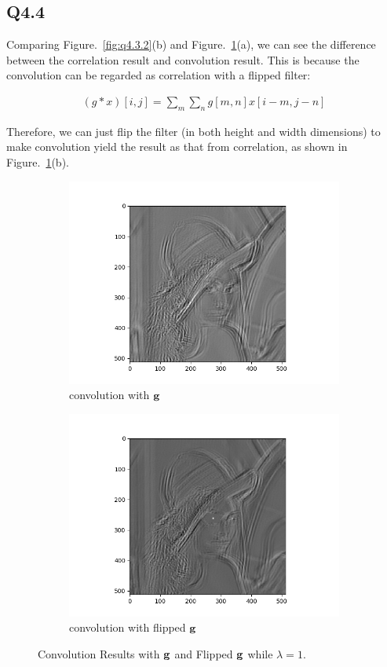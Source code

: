 \documentclass[11pt]{article}
\begin{document}
\newpage
\subsection*{Q4.4}

Comparing Figure.~\ref{fig:q4.3.2}(b) and Figure.~\ref{fig:q4.4}(a), we can see the difference between the correlation result and convolution result. This is because the convolution can be regarded as correlation with a flipped filter:

\begin{align}
  (g*x)[i, j] = \sum_m \sum_n g[m, n] x[i-m, j-n]
\end{align}

Therefore, we can just flip the filter (in both height and width dimensions) to make convolution yield the result as that from correlation, as shown in Figure.~\ref{fig:q4.4}(b).

\begin{figure}[h!]
    \begin{subfigure}{.49\textwidth}
      \centering
      \includegraphics[width=.8\linewidth]{../results/q4_3_lambda_1_conv.png}
      \caption{convolution with $\mathbf{g}$}
    \end{subfigure}
    \begin{subfigure}{.49\textwidth}
      \centering
      \includegraphics[width=.8\linewidth]{../results/q4_3_lambda_1_conv_flip.png}
      \caption{convolution with flipped $\mathbf{g}$}
    \end{subfigure}
    \caption{Convolution Results with $\mathbf{g}$ and Flipped $\mathbf{g}$ while $\lambda=1$. }
    \label{fig:q4.4}
\end{figure}
\end{document}
